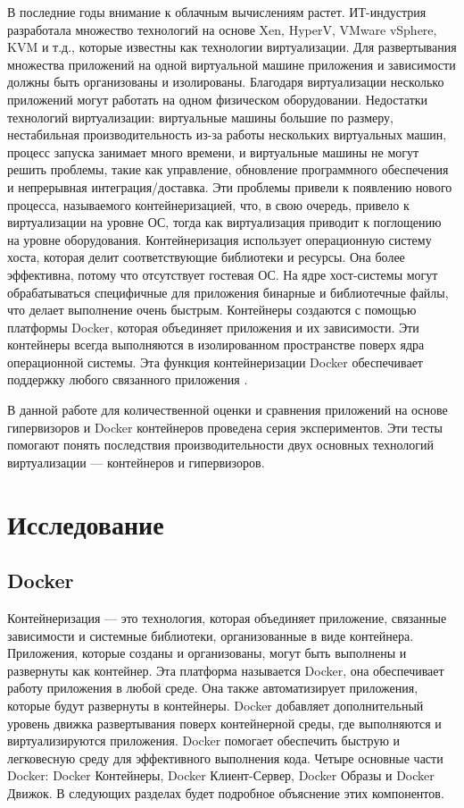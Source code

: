 \documentclass{mirea}
\begin{document}
	В последние годы внимание к облачным вычислениям растет. ИТ-индустрия разработала множество технологий на основе Xen, HyperV, VMware vSphere, KVM и т.д., которые известны как технологии виртуализации. Для развертывания множества приложений на одной виртуальной машине приложения и зависимости должны быть организованы и изолированы. Благодаря виртуализации несколько приложений могут работать на одном физическом оборудовании. Недостатки технологий виртуализации: виртуальные машины большие по размеру, нестабильная производительность из-за работы нескольких виртуальных машин, процесс запуска занимает много времени, и виртуальные машины не могут решить проблемы, такие как управление, обновление программного обеспечения и непрерывная интеграция/доставка. Эти проблемы привели к появлению нового процесса, называемого контейнеризацией, что, в свою очередь, привело к виртуализации на уровне ОС, тогда как виртуализация приводит к поглощению на уровне оборудования. Контейнеризация использует операционную систему хоста, которая делит соответствующие библиотеки и ресурсы. Она более эффективна, потому что отсутствует гостевая ОС. На ядре хост-системы могут обрабатываться специфичные для приложения бинарные и библиотечные файлы, что делает выполнение очень быстрым. Контейнеры создаются с помощью платформы Docker, которая объединяет приложения и их зависимости. Эти контейнеры всегда выполняются в изолированном пространстве поверх ядра операционной системы. Эта функция контейнеризации Docker обеспечивает поддержку любого связанного приложения \cite{cit1}.
	
	В данной работе для количественной оценки и сравнения приложений на основе гипервизоров и Docker контейнеров проведена серия экспериментов. Эти тесты помогают понять последствия производительности двух основных технологий виртуализации — контейнеров и гипервизоров.
	
	
	
	\section{Исследование}
	
	\subsection{Docker}
	
	Контейнеризация — это технология, которая объединяет приложение, связанные зависимости и системные библиотеки, организованные в виде контейнера. Приложения, которые созданы и организованы, могут быть выполнены и развернуты как контейнер. Эта платформа называется Docker, она обеспечивает работу приложения в любой среде. Она также автоматизирует приложения, которые будут развернуты в контейнеры. Docker добавляет дополнительный уровень движка развертывания поверх контейнерной среды, где выполняются и виртуализируются приложения. Docker помогает обеспечить быструю и легковесную среду для эффективного выполнения кода. Четыре основные части Docker: Docker Контейнеры, Docker Клиент-Сервер, Docker Образы и Docker Движок. В следующих разделах будет подробное объяснение этих компонентов.
	
\end{document}
